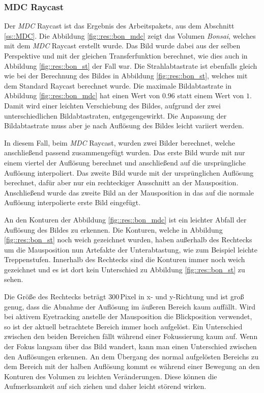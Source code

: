 \subsubsection{MDC Raycast}\label{ss::res::mdc}
Der \emph{MDC} Raycast ist das Ergebnis des Arbeitspakets, aus dem Abschnitt \ref{ss::MDC}.
Die Abbildung \ref{fig::res::bon_mdc} zeigt das Volumen \emph{Bonsai}, welches mit dem \emph{MDC} Raycast erstellt wurde.
Das Bild wurde dabei aus der selben Perspektive und mit der gleichen Transferfunktion berechnet, wie dies auch in Abbildung \ref{fig::res::bon_st} der Fall war.
Die Strahlabtastrate ist ebenfalls gleich wie bei der Berechnung des Bildes in Abbildung \ref{fig::res::bon_st}, welches mit dem Standard Raycast berechnet wurde.
Die maximale Bildabtastrate in Abbildung \ref{fig::res::bon_mdc} hat einen Wert von $0.96$ statt einem Wert von $1$.
Damit wird einer leichten Verschiebung des Bildes, aufgrund der zwei unterschiedlichen Bildabtastraten, entgegengewirkt.
Die Anpassung der Bildabtastrate muss aber je nach Auflösung des Bildes leicht variiert werden.

In diesem Fall, beim \emph{MDC} Raycast, wurden zwei Bilder berechnet, welche anschließend passend zusammengefügt wurden.
Das erste Bild wurde mit nur einem viertel der Auflösung berechnet und anschließend auf die ursprüngliche Auflösung interpoliert.
Das zweite Bild wurde mit der ursprünglichen Auflösung berechnet, dafür aber nur ein rechteckiger Ausschnitt an der Mausposition.
Anschließend wurde das zweite Bild an der Mausposition in das auf die normale Auflösung interpolierte erste Bild eingefügt.

An den Konturen der Abbildung \ref{fig::res::bon_mdc} ist ein leichter Abfall der Auflösung des Bildes zu erkennen.
Die Konturen, welche in Abbildung \ref{fig::res::bon_st} noch weich gezeichnet wurden, haben außerhalb des Rechtecks um die Mausposition nun Artefakte der Unterabtastung, wie zum Beispiel leichte Treppenstufen.
Innerhalb des Rechtecks sind die Konturen immer noch weich gezeichnet und es ist dort kein Unterschied zu Abbildung \ref{fig::res::bon_st} zu sehen.

Die Größe des Rechtecks beträgt $300$\,Pixel in x- und y-Richtung und ist groß genug, dass die Abnahme der Auflösung im äußeren Bereich kaum auffällt.
Wird bei aktivem Eyetracking anstelle der Mausposition die Blickposition verwendet, so ist der aktuell betrachtete Bereich immer hoch aufgelöst.
Ein Unterschied zwischen den beiden Bereichen fällt während einer Fokussierung kaum auf.
Wenn der Fokus langsam über das Bild wandert, kann man einen Unterschied zwischen den Auflösungen erkennen.
An dem Übergang des normal aufgelösten Bereichs zu dem Bereich mit der halben Auflösung kommt es während einer Bewegung an den Konturen des Volumen zu leichten Veränderungen.
Diese können die Aufmerksamkeit auf sich ziehen und daher leicht störend wirken.

